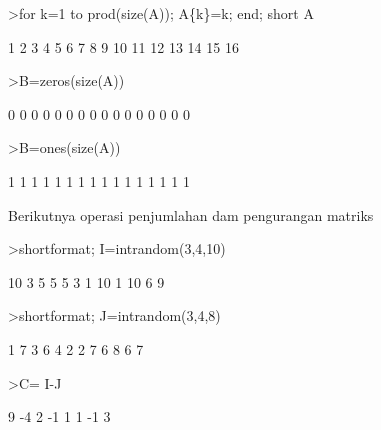 \documentclass[a4paper,10pt]{article}
\begin{document}
\begin{eulernotebook}
\begin{eulercomment}
\begin{eulercomment}
\begin{eulercomment}
\begin{eulercomment}
\begin{eulercomment}
\begin{eulercomment}
\begin{eulercomment}
\begin{eulercomment}
\begin{eulercomment}
\begin{eulercomment}
\begin{euleroutput}
\end{euleroutput}
\begin{eulerprompt}
>for k=1 to prod(size(A)); A\{k\}=k; end; short A
\end{eulerprompt}
\begin{euleroutput}
          1         2         3         4 
          5         6         7         8 
          9        10        11        12 
         13        14        15        16 
\end{euleroutput}
\begin{eulerprompt}
>B=zeros(size(A))
\end{eulerprompt}
\begin{euleroutput}
          0         0         0         0 
          0         0         0         0 
          0         0         0         0 
          0         0         0         0 
\end{euleroutput}
\begin{eulerprompt}
>B=ones(size(A))
\end{eulerprompt}
\begin{euleroutput}
          1         1         1         1 
          1         1         1         1 
          1         1         1         1 
          1         1         1         1 
\end{euleroutput}
\begin{eulercomment}
Berikutnya operasi penjumlahan dam pengurangan matriks
\end{eulercomment}
\begin{eulerprompt}
>shortformat; I=intrandom(3,4,10) 
\end{eulerprompt}
\begin{euleroutput}
         10         3         5         5 
          5         3         1        10 
          1        10         6         9 
\end{euleroutput}
\begin{eulerprompt}
>shortformat; J=intrandom(3,4,8)
\end{eulerprompt}
\begin{euleroutput}
          1         7         3         6 
          4         2         2         7 
          6         8         6         7 
\end{euleroutput}
\begin{eulerprompt}
>C= I-J
\end{eulerprompt}
\begin{euleroutput}
          9        -4         2        -1 
          1         1        -1         3 

\end{euleroutput}
\end{eulercomment}
\end{eulercomment}
\end{eulercomment}
\end{eulercomment}
\end{eulercomment}
\end{eulercomment}
\end{eulercomment}
\end{eulercomment}
\end{eulercomment}
\end{eulercomment}
\end{eulernotebook}
\end{document}

